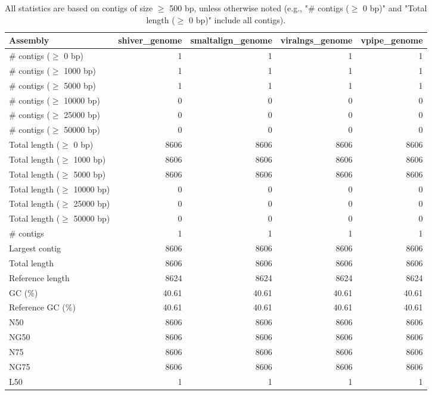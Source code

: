 \documentclass[12pt,a4paper]{article}
\begin{document}
\begin{table}[ht]
\begin{center}
\caption{All statistics are based on contigs of size $\geq$ 500 bp, unless otherwise noted (e.g., "\# contigs ($\geq$ 0 bp)" and "Total length ($\geq$ 0 bp)" include all contigs).}
\begin{tabular}{|l*{4}{|r}|}
\hline
Assembly & shiver\_genome & smaltalign\_genome & viralngs\_genome & vpipe\_genome \\ \hline
\# contigs ($\geq$ 0 bp) & 1 & 1 & 1 & 1 \\ \hline
\# contigs ($\geq$ 1000 bp) & 1 & 1 & 1 & 1 \\ \hline
\# contigs ($\geq$ 5000 bp) & 1 & 1 & 1 & 1 \\ \hline
\# contigs ($\geq$ 10000 bp) & 0 & 0 & 0 & 0 \\ \hline
\# contigs ($\geq$ 25000 bp) & 0 & 0 & 0 & 0 \\ \hline
\# contigs ($\geq$ 50000 bp) & 0 & 0 & 0 & 0 \\ \hline
Total length ($\geq$ 0 bp) & 8606 & 8606 & 8606 & 8606 \\ \hline
Total length ($\geq$ 1000 bp) & 8606 & 8606 & 8606 & 8606 \\ \hline
Total length ($\geq$ 5000 bp) & 8606 & 8606 & 8606 & 8606 \\ \hline
Total length ($\geq$ 10000 bp) & 0 & 0 & 0 & 0 \\ \hline
Total length ($\geq$ 25000 bp) & 0 & 0 & 0 & 0 \\ \hline
Total length ($\geq$ 50000 bp) & 0 & 0 & 0 & 0 \\ \hline
\# contigs & 1 & 1 & 1 & 1 \\ \hline
Largest contig & 8606 & 8606 & 8606 & 8606 \\ \hline
Total length & 8606 & 8606 & 8606 & 8606 \\ \hline
Reference length & 8624 & 8624 & 8624 & 8624 \\ \hline
GC (\%) & 40.61 & 40.61 & 40.61 & 40.61 \\ \hline
Reference GC (\%) & 40.61 & 40.61 & 40.61 & 40.61 \\ \hline
N50 & 8606 & 8606 & 8606 & 8606 \\ \hline
NG50 & 8606 & 8606 & 8606 & 8606 \\ \hline
N75 & 8606 & 8606 & 8606 & 8606 \\ \hline
NG75 & 8606 & 8606 & 8606 & 8606 \\ \hline
L50 & 1 & 1 & 1 & 1 \\ \hline

\end{tabular}
\end{center}
\end{table}
\end{document}
